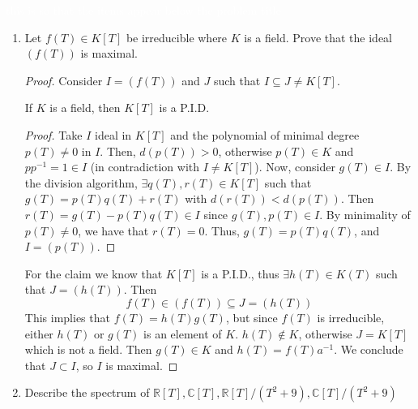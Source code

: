 \begin{problem}\textcolor{white}{this is so that the items appear below the problem title}
    \begin{enumerate}[label=(\theproblem.\arabic*),ref=\theproblem.\arabic*]
        \item Let $f(T) \in K[T]$ be irreducible where $K$ is a field.
        Prove that the ideal $(f(T))$ is maximal.
            \begin{sol}
                \begin{proof}
                    Consider $I = (f(T))$ and $J$ such that $I \subseteq J \neq K[T]$.
                    \begin{claim} \label{itm:polynomial_field_is_pid}
                        If $K$ is a field, then $K[T]$ is a P.I.D.
                        \begin{proof}
                            Take $I$ ideal in $K[T]$ and the polynomial of minimal degree $p(T) \neq 0$ in $I$.
                            Then, $d(p(T)) > 0$, otherwise $p(T) \in K$ and $p p^{-1} = 1 \in I$ (in contradiction with $I \neq K[T]$).
                            Now, consider $g(T) \in I$.
                            By the division algorithm, $\exists q(T), r(T) \in K[T]$ such that $g(T) = p(T) q(T) + r(T)$ with $d(r(T)) < d(p(T))$.
                            Then $r(T) = g(T) - p(T) q(T) \in I$ since $g(T), p(T) \in I$.
                            By minimality of $p(T) \neq 0$, we have that $r(T) = 0$.
                            Thus, $g(T) = p(T) q(T)$, and $I = (p(T))$.
                        \end{proof}
                    \end{claim}
                    For the claim we know that $K[T]$ is a P.I.D., thus $\exists h(T) \in K(T)$ such that $J = (h(T))$.
                    Then
                    \[ f(T) \in (f(T)) \subseteq J = (h(T)) \]
                    This implies that $f(T) = h(T) g(T)$, but since $f(T)$ is irreducible, either $h(T)$ or $g(T)$ is an element of $K$.
                    $h(T) \notin K$, otherwise $J = K[T]$ which is not a field.
                    Then $g(T) \in K$ and $h(T) = f(T) a^{-1}$.
                    We conclude that $J \subset I$, so $I$ is maximal.
                \end{proof}
            \end{sol}
        \item Describe the spectrum of $\mathbb{R}[T], \mathbb{C}[T], \mathbb{R}[T]/(T^2+9), \mathbb{C}[T]/(T^2+9)$
            \begin{sol}

\end{sol}
\end{enumerate}
\end{problem}
